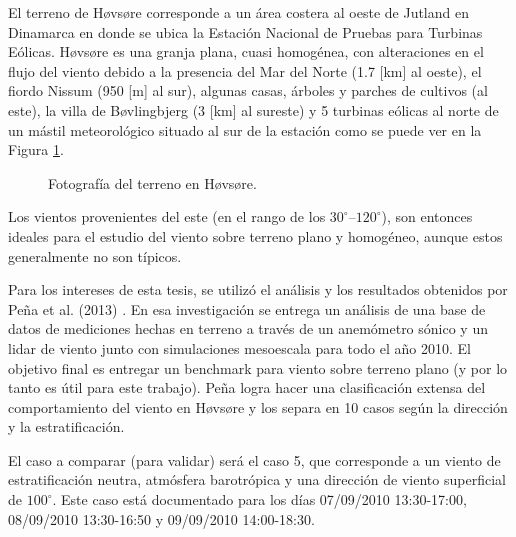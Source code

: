  El terreno de Høvsøre corresponde a un área costera al oeste de Jutland en Dinamarca en donde se ubica la Estación Nacional de Pruebas para Turbinas Eólicas. Høvsøre es una granja plana, cuasi homogénea, con alteraciones en el flujo del viento debido a la presencia del Mar del Norte (1.7 [km] al oeste), el fiordo Nissum (950 [m] al sur), algunas casas, árboles y parches de cultivos (al este), la villa de Bøvlingbjerg (3 [km] al sureste) y 5 turbinas eólicas al norte de un mástil meteorológico situado al sur de la estación como se puede ver en la Figura \ref{fig:05_terreno_hovsore}.
 
 \begin{figure}[H]
 	\centering{}%
 	\caption{Fotografía del terreno en Høvsøre.}
 	\label{fig:05_terreno_hovsore}
 \end{figure}
 
 Los vientos provenientes del este (en el rango de los $30^\circ$--$120^\circ$), son entonces ideales para el estudio del viento sobre terreno plano y homogéneo, aunque estos generalmente no son típicos.
 
 Para los intereses de esta tesis, se utilizó el análisis y los resultados obtenidos por Peña et al. (2013) \cite{Pea2013}. En esa investigación se entrega un análisis de una base de datos de mediciones hechas en terreno a través de un anemómetro sónico y un lidar de viento junto con simulaciones mesoescala para todo el año 2010. El objetivo final es entregar un benchmark para viento sobre terreno plano (y por lo tanto es útil para este trabajo). Peña logra hacer una clasificación extensa del comportamiento del viento en Høvsøre y los separa en 10 casos según la dirección y la estratificación.
 
 El caso a comparar (para validar) será el caso 5, que corresponde a un viento de estratificación neutra, atmósfera barotrópica y una dirección de viento superficial de $100^\circ$. Este caso está documentado para los días 07/09/2010 13:30-17:00, 08/09/2010 13:30-16:50 y 09/09/2010 14:00-18:30. 

